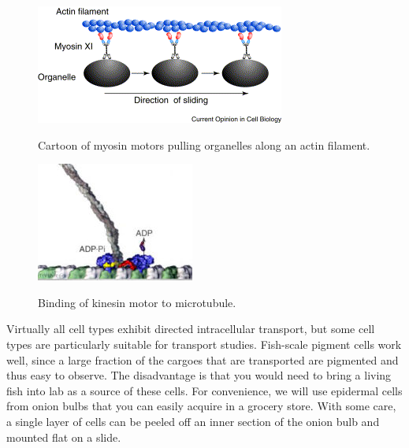 \documentclass{../lab}
\begin{document}
\begin{figure}[h]
\begin{minipage}[t]{.475\textwidth}
    \centering
    \href{http://experimentationlab.berkeley.edu/sites/default/files/images/Myosin.gif}{\includegraphics[width=\linewidth,keepaspectratio]{images/Myosin.png}}
    \caption{Cartoon of myosin motors pulling organelles along an actin filament.}
\end{minipage}\hfill
\begin{minipage}[t]{.475\textwidth}
    \centering
    \href{http://experimentationlab.berkeley.edu/sites/default/files/images/196px-Kinesin.jpg}{\includegraphics[width=\linewidth,keepaspectratio]{images/196px-Kinesin.jpg}}
    \caption{Binding of kinesin motor to microtubule.}
\end{minipage}
\end{figure}

Virtually all cell types exhibit directed intracellular transport, but some cell types are particularly suitable for transport studies. Fish-scale pigment cells work well, since a large fraction of the cargoes that are transported are pigmented and thus easy to observe. The disadvantage is that you would need to bring a living fish into lab as a source of these cells. For convenience, we will use epidermal cells from onion bulbs that you can easily acquire in a grocery store. With some care, a single layer of cells can be peeled off an inner section of the onion bulb and mounted flat on a slide.
\end{document}
